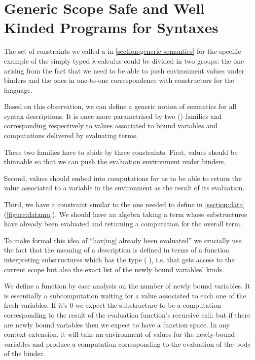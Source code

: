 \chapter{Generic Scope Safe and Well Kinded Programs for Syntaxes}\label{chapter:generic-semantics}

The set of constraints we called a  in \cref{section:generic-semantics}
for the specific example of the simply typed λ-calculus could be divided in two groups:
the one arising from the fact that we need to be able to push environment values under
binders and the ones in one-to-one correspondence with constructors for the language.

Based on this observation, we can define a generic notion of semantics for all syntax
descriptions. It is once more parametrised by two () families 
and  corresponding respectively to values associated to bound variables and
computations delivered by evaluating terms.


These two families have to abide by three constraints. First, values should be thinnable
so that we can push the evaluation environment under binders.


Second, values should embed into computations for us to be able to return the value
associated to a variable in the environment as the result of its evaluation.


Third, we have a constraint similar to the one needed to define  in
\cref{section:data} (\cref{figure:datamu}). We should have an algebra taking
a term whose substructures have already been evaluated and returning a
computation for the overall term.


To make formal this idea of ``hav[ing] already been evaluated'' we crucially use
the fact that the meaning of a description is defined in terms of a function
interpreting substructures which has the type (   ),
i.e. that gets access to the current scope but also the exact list of the newly
bound variables' kinds.

We define a function  by case analysis on the number of newly bound
variables. It is essentially a subcomputation waiting for a value associated to
each one of the fresh variables. If it's $0$ we expect the substructure to be a
computation corresponding to the result of the evaluation function's recursive
call; but if there are newly bound variables then we expect to have a function
space. In any context extension, it will take an environment of values for the
newly-bound variables and produce a computation corresponding to the evaluation
of the body of the binder.

